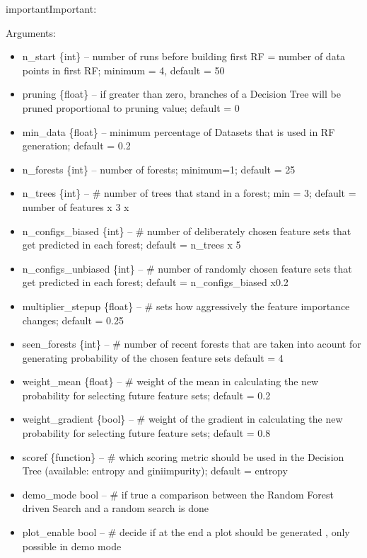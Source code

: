 \documentclass[letterpaper,10pt,english]{sphinxmanual}
\begin{document}
\begin{sphinxadmonition}{important}{Important:}
\begin{fulllineitems}
Arguments:
\begin{itemize}
\item {} 
n\_start \{int\} -- number of runs before building first RF = number of data points in first RF; minimum = 4, default = 50

\item {} 
pruning \{float\} -- if greater than zero, branches of a Decision Tree will be pruned proportional to pruning value; default = 0

\item {} 
min\_data \{float\} -- minimum percentage of Datasets that is used in RF generation; default = 0.2

\item {} 
n\_forests \{int\} -- number of forests; minimum=1;  default = 25

\item {} 
n\_trees \{int\} -- \# number of trees that stand in a forest; min = 3; default = number of features x 3 x

\item {} 
n\_configs\_biased \{int\} -- \# number of deliberately chosen feature sets that get predicted in each forest; default = n\_trees x 5

\item {} 
n\_configs\_unbiased \{int\} -- \# number of randomly chosen feature sets that get predicted in each forest; default = n\_configs\_biased x0.2

\item {} 
multiplier\_stepup \{float\} -- \# sets how aggressively the feature importance changes; default = 0.25

\item {} 
seen\_forests \{int\} -- \# number of recent forests that are taken into acount for generating probability of the chosen feature sets default = 4

\item {} 
weight\_mean \{float\} -- \# weight of the mean in calculating the new probability for selecting future feature sets; default = 0.2

\item {} 
weight\_gradient \{bool\} -- \# weight of the gradient in calculating the new probability for selecting future feature sets; default = 0.8

\item {} 
scoref \{function\} -- \# which scoring metric should be used in the Decision Tree (available: entropy and giniimpurity); default = entropy

\item {} 
demo\_mode bool -- \# if true a comparison between the Random Forest driven Search and a random search is done

\item {} 
plot\_enable bool -- \# decide if at the end a plot should be generated , only possible in demo mode

\end{itemize}

\end{fulllineitems}

\label{\detokenize{DT:blank}}\end{sphinxadmonition}
\end{document}

